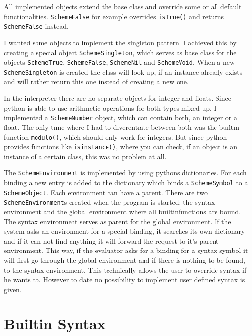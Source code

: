 \documentclass[12pt,a4paper]{scrartcl}
\begin{document}
All implemented objects extend the base class and override some or all default functionalities. \lstinline{SchemeFalse} for example overrides \lstinline{isTrue()} and returns \lstinline{SchemeFalse} instead.

I wanted some objects to implement the singleton pattern. I achieved this by creating a special object \lstinline{SchemeSingleton}, which serves as base class for the objects \lstinline{SchemeTrue}, \lstinline{SchemeFalse}, \lstinline{SchemeNil} and \lstinline{SchemeVoid}. When a new \lstinline{SchemeSingleton} is created the class will look up, if an instance already exists and will rather return this one instead of creating a new one. 

In the interpreter there are no separate objects for integer and floats. Since python is able to use arithmetic operations for both types mixed up, I implemented a \lstinline{SchemeNumber} object, which can contain both, an integer or a float. The only time where I had to diverentiate between both was the builtin function \lstinline{modulo()}, which should only work for integers. But since python provides functions like \lstinline{isinstance()}, where you can check, if an object is an instance of a certain class, this was no problem at all.

The \lstinline{SchemeEnvironment} is implemented by using pythons dictionaries. For each binding a new entry is added to the dictionary which binds a \lstinline{SchemeSymbol} to a \lstinline{SchemeObject}. Each environment can have a parent. There are two \lstinline{SchemeEnvironment}s created when the program is started: the syntax environment and the global environment where all builtinfunctions are bound. The syntax environment serves as parent for the global environment. If the system asks an environment for a special binding, it searches its own dictionary and if it can not find anything it will forward the request to it's parent environment. This way, if the evaluator asks for a binding for a syntax symbol it will first go through the global environment and if there is nothing to be found, to the syntax environment. This technically allows the user to override syntax if he wants to. However to date no possibility to implement user defined syntax is given. 



\section*{Builtin Syntax}
\end{document}
